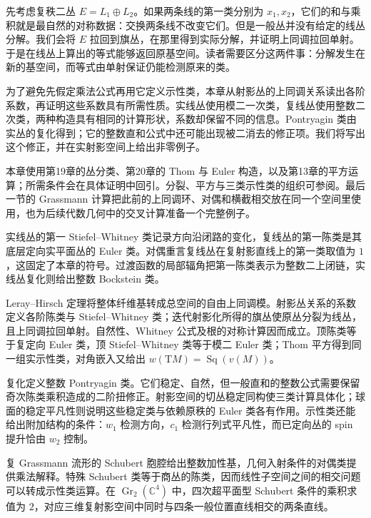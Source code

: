\ProseParagraphBreak

先考虑复秩二丛 \(E=L_1\oplus L_2\)。如果两条线的第一类分别为 \(x_1,x_2\)，它们的和与乘积就是最自然的对称数据：交换两条线不改变它们。但是一般丛并没有给定的线丛分解。我们会将 \(E\) 拉回到旗丛，在那里得到实际分解，并证明上同调拉回单射。于是在线丛上算出的等式能够返回原基空间。读者需要区分这两件事：分解发生在新的基空间，而等式由单射保证仍能检测原来的类。

\ProseParagraphBreak

为了避免先假定乘法公式再用它定义示性类，本章从射影丛的上同调关系读出各阶系数，再证明这些系数具有所需性质。实线丛使用模二一次类，复线丛使用整数二次类，两种构造具有相同的计算形状，系数却保留不同的信息。Pontryagin 类由实丛的复化得到；它的整数直和公式中还可能出现被二消去的修正项。我们将写出这个修正，并在实射影空间上给出非零例子。

\ProseParagraphBreak

本章使用第19章的丛分类、第20章的 Thom 与 Euler 构造，以及第13章的平方运算；所需条件会在具体证明中回引。分裂、平方与三类示性类的组织可参阅\cite[第23章第6--7节]{May1999}。最后一节的 Grassmann 计算把此前的上同调环、对偶和横截相交放在同一个空间里使用，也为后续代数几何中的交叉计算准备一个完整例子。







\begin{chaptersummary}
	实线丛的第一 Stiefel--Whitney 类记录方向沿闭路的变化，复线丛的第一陈类是其底层定向实平面丛的 Euler 类。对偶重言复线丛在复射影直线上的第一类取值为 \(1\)，这固定了本章的符号。过渡函数的局部辐角把第一陈类表示为整数二上闭链，实线丛复化则给出整数 Bockstein 类。

	\ProseParagraphBreak

	Leray--Hirsch 定理将整体纤维基转成总空间的自由上同调模。射影丛关系的系数定义各阶陈类与 Stiefel--Whitney 类；迭代射影化所得的旗丛使原丛分裂为线丛，且上同调拉回单射。自然性、Whitney 公式及根的对称计算因而成立。顶陈类等于复定向 Euler 类，顶 Stiefel--Whitney 类等于模二 Euler 类；Thom 平方得到同一组实示性类，对角嵌入又给出 \(w(\mathrm TM)=\operatorname{Sq}(v(M))\)。

	\ProseParagraphBreak

	复化定义整数 Pontryagin 类。它们稳定、自然，但一般直和的整数公式需要保留奇次陈类乘积造成的二阶扭修正。射影空间的切丛稳定同构使三类计算具体化；球面的稳定平凡性则说明这些稳定类与依赖原秩的 Euler 类各有作用。示性类还能给出附加结构的条件：\(w_1\) 检测方向，\(c_1\) 检测行列式平凡性，而已定向丛的 spin 提升恰由 \(w_2\) 控制。

	\ProseParagraphBreak

	复 Grassmann 流形的 Schubert 胞腔给出整数加性基，几何入射条件的对偶类提供乘法解释。特殊 Schubert 类等于商丛的陈类，因而线性子空间之间的相交问题可以转成示性类运算。在 \(\operatorname{Gr}_2(\mathbb C^4)\) 中，四次超平面型 Schubert 条件的乘积求值为 \(2\)，对应三维复射影空间中同时与四条一般位置直线相交的两条直线。
\end{chaptersummary}

